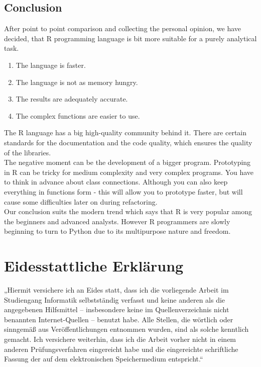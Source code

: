 \documentclass[
  twoside,
  11pt, a4paper,
  footinclude=true,
  headinclude=true,
  cleardoublepage=empty
]{scrreprt}
\begin{document}
    \section{Conclusion}
    After point to point comparison and collecting the personal opinion, we have decided, that R programming language is bit more suitable for a purely analytical task.
    \begin{enumerate}
        \item The language is faster.
        \item The language is not as memory hungry.
        \item The results are adequately accurate. 
        \item The complex functions are easier to use.
    \end{enumerate}
    The R language has a big high-quality community behind it. There are certain standards for the documentation and the code quality, which ensures the quality of the libraries.\\
    The negative moment can be the development of a bigger program. Prototyping in R can be tricky for medium complexity and very complex programs. You have to think in advance about class connections. Although you can also keep everything in functions form - this will allow you to prototype faster, but will cause some difficulties later on during refactoring.\\
    Our conclusion suits the modern trend which says that R is very popular among the beginners and advanced analysts. However R programmers are slowly beginning to turn to Python due to its multipurpose nature and freedom.

    
    
    
    \chapter*{Eidesstattliche Erklärung}
        \onehalfspace
        „Hiermit versichere ich an Eides statt, dass ich die vorliegende Arbeit im Studiengang Informatik selbstständig verfasst und keine anderen als die angegebenen Hilfsmittel – insbesondere keine im Quellenverzeichnis nicht benannten Internet-Quellen – benutzt habe. Alle Stellen, die wörtlich oder sinngemäß aus Veröffentlichungen entnommen wurden, sind als solche kenntlich gemacht. Ich versichere weiterhin, dass ich die Arbeit vorher nicht in einem anderen Prüfungsverfahren eingereicht habe und die eingereichte schriftliche Fassung der auf dem elektronischen Speichermedium entspricht.“
        \singlespace
    
\end{document}
